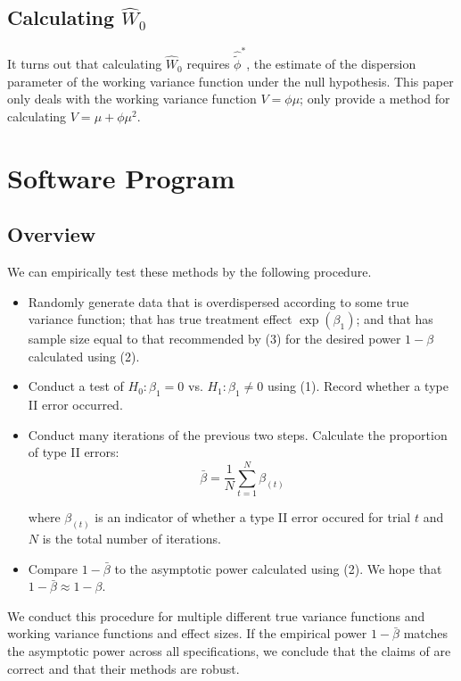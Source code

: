 \documentclass{article}
\begin{document}
\normalsize

\subsection{Calculating $\hat{W}_0$}

It turns out that calculating $\hat{W}_0$ requires $\hat{\tilde{\phi}}^*$, the
estimate of the dispersion parameter of the working variance function under the null hypothesis.
This paper only deals with the working variance function $V=\phi \mu$;
\cite{igeta2018} only provide a method for calculating $V = \mu + \phi \mu^2$.

\section{Software Program}

\subsection{Overview}

We can empirically test these methods by the following procedure.

\begin{itemize}
	\item Randomly generate data that is overdispersed according to some
		true variance function; that has true treatment
		effect $\exp{(\beta_1)}$; and that has sample size equal to that
		recommended by (3) for the desired power $1-\beta$ calculated
		using (2).
	\item Conduct a test of $H_0: \beta_1 = 0$ vs. $H_1: \beta_1 \neq 0$
		using (1). Record whether a type II error occurred.
	\item Conduct many iterations of the previous two steps.
		Calculate the proportion of type II errors:
		$$
		\bar{\beta} = \frac{1}{N}\sum_{t = 1}^N \beta_{(t)}
		$$

		where $\beta_{(t)}$ is an indicator of whether a type II error
		occured for trial $t$ and $N$ is the total number of iterations.
	\item Compare $1-\bar{\beta}$ to the asymptotic power calculated using (2). We
		hope that $1-\bar{\beta} \approx 1 - \beta$.
\end{itemize}

We conduct this procedure for multiple different true variance functions and
working variance functions and effect sizes. If the empirical power $1 - \bar{\beta}$ 
matches the asymptotic power across all specifications, we conclude that the claims of
\cite{igeta2018} are correct and that their methods are robust.
\end{document}

